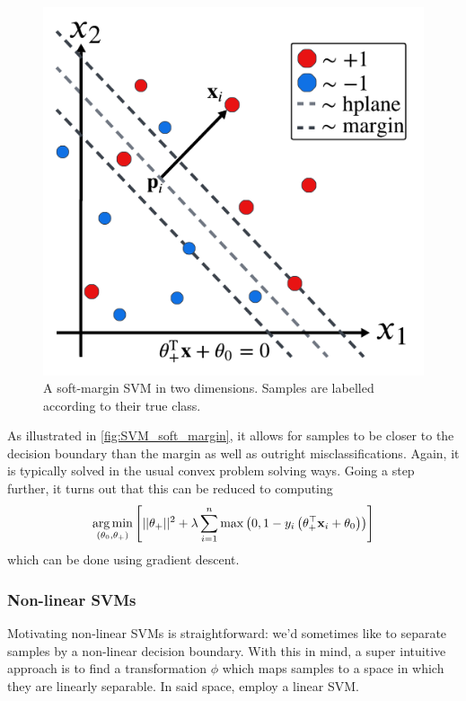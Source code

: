\documentclass[11pt]{article}
\begin{document}
\begin{figure}[t]
    \centering
    \begin{minipage}{0.54\linewidth}
        \includegraphics[width=\linewidth]{./figures/supervised_learning/SVM_soft_margin.pdf}
    \end{minipage}%
    \hfill
    \begin{minipage}{0.46\linewidth}
        \caption{A soft-margin SVM in two dimensions. Samples are labelled according to their true class.}
        \label{fig:SVM_soft_margin}
    \end{minipage}
\end{figure}

As illustrated in \autoref{fig:SVM_soft_margin}, it allows for samples to be closer to the decision boundary than the margin as well as outright misclassifications. Again, it is typically solved in the usual convex problem solving ways. Going a step further, it turns out that this can be reduced to computing
$$
\operatorname*{arg\,min}_{(\theta_0,\theta_+)}\left[||\theta_+||^2+\lambda\sum_{i=1}^n\max\left(0,1-y_i\left(\theta_+^\top \mathbf{x}_i+\theta_0\right)\right)\right]
$$
which can be done using gradient descent.

\subsubsection{Non-linear SVMs}
Motivating non-linear SVMs is straightforward: we'd sometimes like to separate samples by a non-linear decision boundary. With this in mind, a super intuitive approach is to find a transformation $\phi$ which maps samples to a space in which they are linearly separable. In said space, employ a linear SVM.
\end{document}
